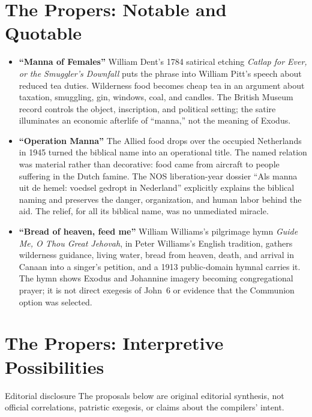 \section*{The Propers: Notable and Quotable}

\begin{itemize}
\item \textbf{“Manna of Females”\enspace{}} William Dent's 1784 satirical etching \emph{Catlap for
Ever, or the Smuggler's Downfall} puts the phrase into William Pitt's speech
about reduced tea duties. Wilderness food becomes cheap tea in an argument
about taxation, smuggling, gin, windows, coal, and candles. The British Museum
record controls the object, inscription, and political setting; the satire
illuminates an economic afterlife of “manna,” not the meaning of Exodus.

\item \textbf{“Operation Manna”\enspace{}} The Allied food drops over the occupied Netherlands in
1945 turned the biblical name into an operational title. The named relation
was material rather than decorative: food came from aircraft to people
suffering in the Dutch famine. The NOS liberation-year dossier “Als manna uit
de hemel: voedsel gedropt in Nederland” explicitly explains the biblical
naming and preserves the danger, organization, and human labor behind the
aid. The relief, for all its biblical name, was no unmediated miracle.

\item \textbf{“Bread of heaven, feed me”\enspace{}} William Williams's pilgrimage hymn \emph{Guide Me, O Thou Great
Jehovah}, in Peter Williams's English tradition, gathers wilderness guidance,
living water, bread from heaven, death, and arrival in Canaan into a singer's
petition, and a 1913 public-domain hymnal carries it. The hymn shows Exodus and Johannine imagery becoming congregational prayer; it is not
direct exegesis of John~6 or evidence that the Communion option was selected.
\end{itemize}

\section*{The Propers: Interpretive Possibilities}

\begin{studybox}{Editorial disclosure}
The proposals below are original editorial synthesis, not official
correlations, patristic exegesis, or claims about the compilers' intent.
\end{studybox}

